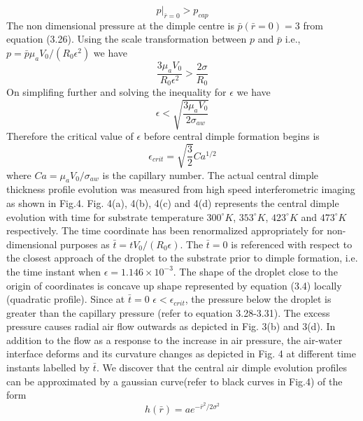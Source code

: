 \documentclass{jfm}
\begin{document}
\begin{equation}
    p|_{\bar{r}=0}>p_{cap}
\end{equation}
The non dimensional pressure at the dimple centre is $\bar{p}(\bar{r}=0)=3$ from equation (3.26). Using the scale transformation between $p$ and $\bar{p}$ i.e., $p=\bar{p}{\mu}_aV_0/(R_0{\epsilon}^2)$ we have
\begin{equation}
    \frac{3{\mu}_aV_0}{R_0{\epsilon}^2} > \frac{2{\sigma}}{R_0}
\end{equation}
On simplifing further and solving the inequality for ${\epsilon}$ we have
\begin{equation}
    {\epsilon}<\sqrt{\frac{3{\mu}_aV_0}{2{\sigma}_{aw}}}
\end{equation}
Therefore the critical value of ${\epsilon}$ before central dimple formation begins is 
\begin{equation}
    {\epsilon}_{crit} = \sqrt{\frac{3}{2}}Ca^{1/2}
\end{equation}
where $Ca={\mu}_aV_0/{\sigma}_{aw}$ is the capillary number.
The actual central dimple thickness profile evolution was measured from high speed interferometric imaging as shown in Fig.4. Fig. 4(a), 4(b), 4(c) and 4(d) represents the central dimple evolution with time for substrate temperature $300^{\circ}K$, $353^{\circ}K$, $423^{\circ}K$ and $473^{\circ}K$ respectively. The time coordinate has been renormalized appropriately for non-dimensional purposes as $\bar{t}=tV_0/(R_0{\epsilon})$. The $\bar{t}=0$ is referenced with respect to the closest approach of the droplet to the substrate prior to dimple formation, i.e. the time instant when ${\epsilon}=1.146{\times}10^{-3}$.  The shape of the droplet close to the origin of coordinates is concave up shape represented by equation (3.4) locally (quadratic profile). Since at $\bar{t}=0$ ${\epsilon}<{\epsilon}_{crit}$, the pressure below the droplet is greater than the capillary pressure (refer to equation 3.28-3.31). The excess pressure causes radial air flow outwards as depicted in Fig. 3(b) and 3(d). In addition to the flow as a response to the increase in air pressure, the air-water interface deforms and its curvature changes as depicted in Fig. 4 at different time instants labelled by $\bar{t}$.  We discover that the central air dimple evolution profiles can be approximated by a gaussian curve(refer to black curves in Fig.4) of the form
\begin{equation}
    h(\bar{r})=ae^{-\bar{r}^2/2{\sigma}^2}
\end{equation}
\end{document}
